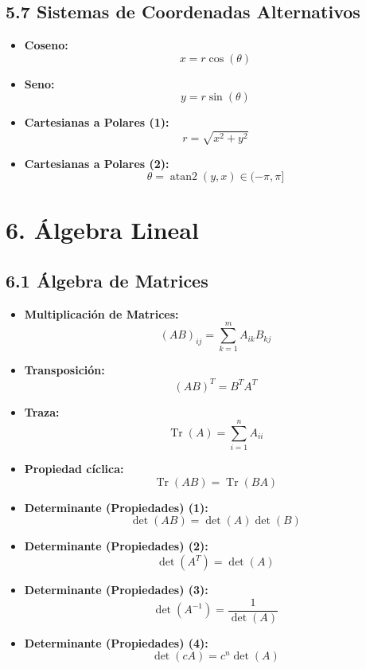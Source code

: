 \documentclass[11pt,a4paper]{article}
\begin{document}
\subsection*{5.7 Sistemas de Coordenadas Alternativos}

\begin{itemize}
  \item \textbf{Coseno:}
  \[
    x = r\cos(\theta)
  \]
  \item \textbf{Seno:}
  \[
    y = r\sin(\theta)
  \]
  \item \textbf{Cartesianas a Polares (1):}
  \[
    r = \sqrt{x^2 + y^2}
  \]
  \item \textbf{Cartesianas a Polares (2):}
  \[
    \theta = \operatorname{atan2}(y, x) \in (-\pi, \pi]
  \]
\end{itemize}

\section*{6. Álgebra Lineal}

\subsection*{6.1 Álgebra de Matrices}

\begin{itemize}
  \item \textbf{Multiplicación de Matrices:}
  \[
    (AB)_{ij} = \sum_{k=1}^m A_{ik} B_{kj}
  \]
  \item \textbf{Transposición:}
  \[
    (AB)^T = B^T A^T
  \]
  \item \textbf{Traza:}
  \[
    \operatorname{Tr}(A) = \sum_{i=1}^n A_{ii}
  \]
  \item \textbf{Propiedad cíclica:}
  \[
    \operatorname{Tr}(AB) = \operatorname{Tr}(BA)
  \]
  \item \textbf{Determinante (Propiedades) (1):}
  \[
    \det(AB) = \det(A)\det(B)
  \]
  \item \textbf{Determinante (Propiedades) (2):}
  \[
    \det(A^T) = \det(A)
  \]
  \item \textbf{Determinante (Propiedades) (3):}
  \[
    \det(A^{-1}) = \frac{1}{\det(A)}
  \]
  \item \textbf{Determinante (Propiedades) (4):}
  \[
    \det(cA) = c^n \det(A)
  \]
\end{itemize}
\end{document}
